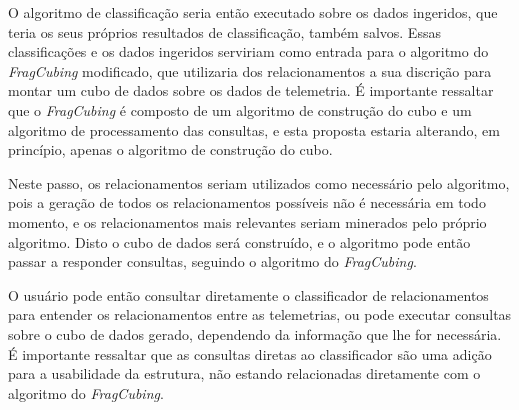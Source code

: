 O algoritmo de classificação seria então executado sobre os dados ingeridos, que teria os seus próprios resultados de classificação, também salvos.
Essas classificações e os dados ingeridos serviriam como entrada para o algoritmo do \textit{FragCubing} modificado, que utilizaria dos relacionamentos a sua discrição para montar um cubo de dados sobre os dados de telemetria.
É importante ressaltar que o \textit{FragCubing} é composto de um algoritmo de construção do cubo e um algoritmo de processamento das consultas, e esta proposta estaria alterando, em princípio, apenas o algoritmo de construção do cubo.

Neste passo, os relacionamentos seriam utilizados como necessário pelo algoritmo, pois a geração de todos os relacionamentos possíveis não é necessária em todo momento, e os relacionamentos mais relevantes seriam minerados pelo próprio algoritmo.
Disto o cubo de dados será construído, e o algoritmo pode então passar a responder consultas, seguindo o algoritmo do \textit{FragCubing}.

O usuário pode então consultar diretamente o classificador de relacionamentos para entender os relacionamentos entre as telemetrias, ou pode executar consultas sobre o cubo de dados gerado, dependendo da informação que lhe for necessária.
É importante ressaltar que as consultas diretas ao classificador são uma adição para a usabilidade da estrutura, não estando relacionadas diretamente com o algoritmo do \textit{FragCubing}.

